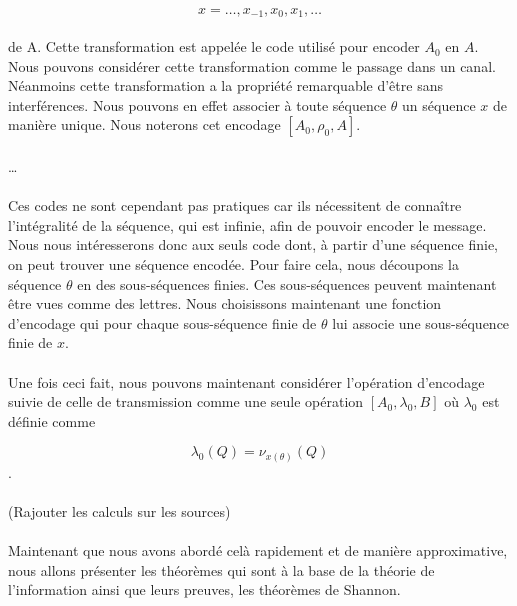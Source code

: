 	\[x = \dots,x_{-1},x_{0},x_{1},\dots\]

	\paragraph{}
	de A. Cette transformation est appelée le code utilisé pour encoder $A_0$ en $A$. Nous pouvons considérer cette 
	transformation comme le passage dans un canal. Néanmoins cette transformation a la propriété remarquable d'être 
	sans interférences. Nous pouvons en effet associer à toute séquence $\theta$ un séquence $x$ de manière unique. 
	Nous noterons cet encodage $[A_0,\rho_0,A]$.

	\paragraph{}
	…

	\paragraph{}
	Ces codes ne sont cependant pas pratiques car ils nécessitent de connaître l'intégralité de la séquence, qui est 
	infinie, afin de pouvoir encoder le message. Nous  nous intéresserons donc aux seuls code dont, à partir d'une séquence 
	finie, on peut trouver une séquence encodée. Pour faire cela, nous découpons la séquence $\theta$ en des sous-séquences finies. 
	Ces sous-séquences peuvent maintenant être vues comme des lettres. Nous choisissons maintenant une fonction d'encodage qui pour 
	chaque sous-séquence finie de $\theta$ lui associe une sous-séquence finie de $x$. 

	\paragraph{}
	Une fois ceci fait, nous pouvons maintenant considérer l'opération d'encodage suivie de celle de transmission comme une seule 
	opération $[A_0,\lambda_0,B]$ où $\lambda_0$ est définie comme

	\[\lambda_0(Q)=\nu_{x(\theta)}(Q)\].

	\paragraph{}
	(Rajouter les calculs sur les sources)
	
	\paragraph{}
	Maintenant que nous avons abordé celà rapidement et de manière 
	approximative, nous allons présenter les théorèmes qui sont à la base
	de la théorie de l'information ainsi que leurs preuves, les théorèmes
	de Shannon.


